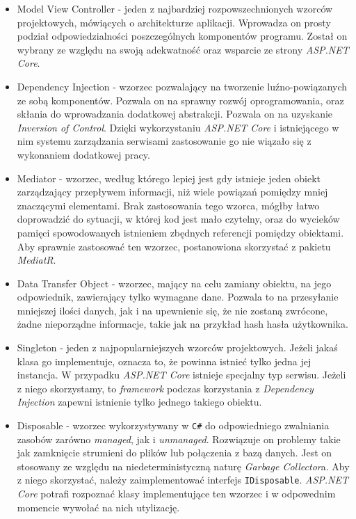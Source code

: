 \begin{itemize}
	\item Model View Controller - jeden z najbardziej rozpowszechnionych wzorców projektowych, mówiących o architekturze aplikacji. Wprowadza on prosty podział odpowiedzialności poszczególnych komponentów programu. Został on wybrany ze względu na swoją adekwatność oraz wsparcie ze strony \emph{ASP.NET Core}.
	\item Dependency Injection - wzorzec pozwalający na tworzenie luźno-powiązanych ze sobą komponentów. Pozwala on na sprawny rozwój oprogramowania, oraz skłania do wprowadzania dodatkowej abstrakcji. Pozwala on na uzyskanie \emph{Inversion of Control}. Dzięki wykorzystaniu \emph{ASP.NET Core} i istniejącego w nim systemu zarządzania serwisami zastosowanie go nie wiązało się z wykonaniem dodatkowej pracy.
	\item Mediator - wzorzec, według którego lepiej jest gdy istnieje jeden obiekt zarządzający przepływem informacji, niż wiele powiązań pomiędzy mniej znaczącymi elementami.\cite{GOF_DESIGN_PATTERNS} Brak zastosowania tego wzorca, mógłby łatwo doprowadzić do sytuacji, w której kod jest mało czytelny, oraz do wycieków pamięci spowodowanych istnieniem zbędnych referencji pomiędzy obiektami. Aby sprawnie zastosować ten wzorzec, postanowiona skorzystać z pakietu \emph{MediatR}.
	\item Data Transfer Object - wzorzec, mający na celu zamiany obiektu, na jego odpowiednik, zawierający tylko wymagane dane. Pozwala to na przesyłanie mniejszej ilości danych, jak i na upewnienie się, że nie zostaną zwrócone, żadne nieporządne informacje, takie jak na przykład hash hasła użytkownika.
	\item Singleton - jeden z najpopularniejszych wzorców projektowych. Jeżeli jakaś klasa go implementuje, oznacza to, że powinna istnieć tylko jedna jej instancja.\cite{GOF_DESIGN_PATTERNS} W przypadku \emph{ASP.NET Core} istnieje specjalny typ serwisu. Jeżeli z niego skorzystamy, to \emph{framework} podczas korzystania z \emph{Dependency Injection} zapewni istnienie tylko jednego takiego obiektu.
	\item Disposable - wzorzec wykorzystywany w \texttt{C\#} do odpowiedniego zwalniania zasobów zarówno \emph{managed}, jak i \emph{unmanaged}.\cite{DOTNET_DISPOSABLE} Rozwiązuje on problemy takie jak zamknięcie strumieni do plików lub połączenia z bazą danych. Jest on stosowany ze względu na niedeterministyczną naturę \emph{Garbage Collector}a. Aby z niego skorzystać, należy zaimplementować interfejs \texttt{IDisposable}. \emph{ASP.NET Core} potrafi rozpoznać klasy implementujące ten wzorzec i w odpowednim momencie wywołać na nich utylizację.
\end{itemize}

